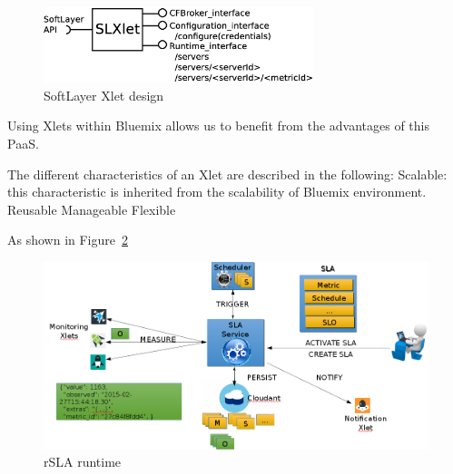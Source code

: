\begin{figure}[H]
\centering
\hspace{1.5cm}
\includegraphics[width=0.7\textwidth]{pics/SLXlet}
\caption{\label{fig:slxlet} SoftLayer Xlet design}
\end{figure}
Using Xlets within Bluemix allows us to benefit from the advantages of this PaaS. 

The different characteristics of an Xlet are described in the following:
Scalable: this characteristic is inherited from the scalability of Bluemix environment.
Reusable 
Manageable
Flexible

As shown in Figure~\ref{fig:runtime}
\begin{figure}[H]
\centering
\includegraphics[width=\textwidth]{pics/runtime.png}
\caption{\label{fig:runtime} rSLA runtime}
\end{figure}